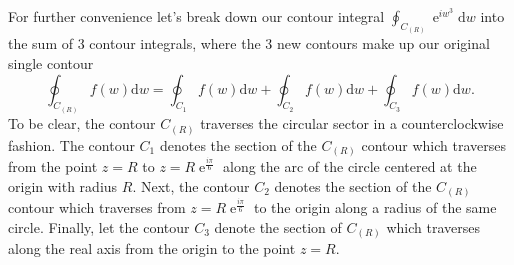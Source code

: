 \documentclass[10pt]{amsart}
\newcommand{\D}{\mathrm{d}}
\DeclareMathOperator{\E}{e}
\theoremstyle{nonumberplain}
\begin{document}
\begin{enumerate}[label={\bf {\arabic*}:}]
\noindent
For further convenience let's break down our contour integral $\oint_{C_{(R)}} \E^{iw^3} \D w$ into the sum of 3 contour integrals, where the 3 new contours make up our original single contour
$$
\oint_{C_{(R)}} f(w) \D w = \oint_{C_{1}} f(w) \D w + \oint_{C_{2}} f(w) \D w + \oint_{C_{3}} f(w) \D w.
$$
To be clear, the contour $C_{(R)}$ traverses the circular sector in a counterclockwise fashion.
The contour $C_1$ denotes the section of the $C_{(R)}$ contour which traverses from the point $z = R$ to $z = R\E^{\frac{i\pi}{6}}$ along the arc of the circle centered at the origin with radius $R$.
Next, the contour $C_2$ denotes the section of the $C_{(R)}$ contour which traverses from $z = R\E^{\frac{i\pi}{6}}$ to the origin along a radius of the same circle.
Finally, let the contour $C_3$ denote the section of $C_{(R)}$ which traverses along the real axis from the origin to the point $z=R$. \\


\end{enumerate}
\end{document}
